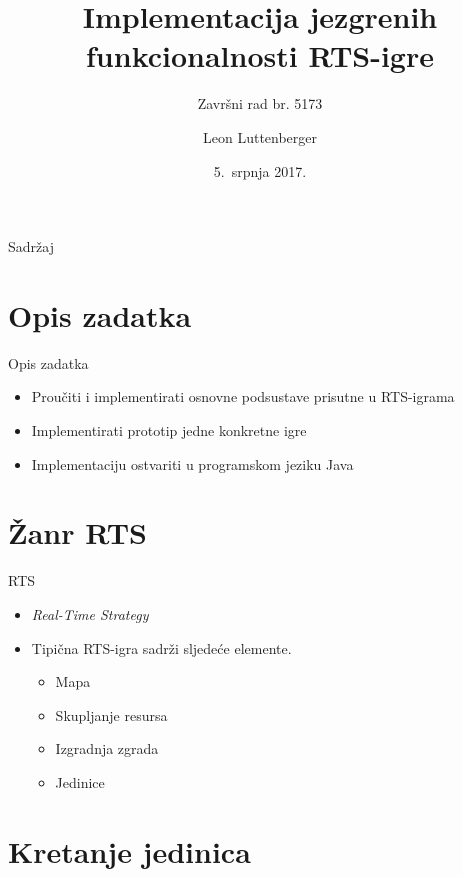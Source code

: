 \documentclass[utf8]{beamer}
\title[Implementacija RTS igre]{Implementacija jezgrenih funkcionalnosti RTS-igre}
\subtitle{Završni rad br. 5173}
\author{Leon Luttenberger}
\institute[FER]
{
    Fakultet elektrotehnike i računarstva\\
    Sveučilište u Zagrebu
}
\date{5.~srpnja 2017.}
\begin{document}
\begin{frame}
    \titlepage
\end{frame}

\begin{frame}{Sadržaj}
    \tableofcontents
\end{frame}

\section{Opis zadatka}

\begin{frame}{Opis zadatka}{}
    \begin{itemize}
        \item {
            Proučiti i implementirati osnovne podsustave prisutne u RTS-igrama
        }
        \item {
            Implementirati prototip jedne konkretne igre
        }
        \item {
            Implementaciju ostvariti u programskom jeziku Java
        }
    \end{itemize}
\end{frame}

\section{Žanr RTS}

\begin{frame}{RTS}
    \begin{itemize}
        \item {
            \textit{Real-Time Strategy}
        }
        \item {   
            Tipična RTS-igra sadrži sljedeće elemente.
            \begin{itemize}
                \item Mapa
                \item Skupljanje resursa
                \item Izgradnja zgrada
                \item Jedinice
            \end{itemize}
        }
    \end{itemize}
\end{frame}

\section{Kretanje jedinica}
\end{document}
